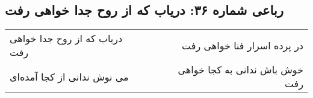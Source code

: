\begin{center}
\section*{رباعی شماره ۳۶: دریاب که از روح جدا خواهی رفت}
\label{sec:sh036}
\begin{longtable}{l p{0.5cm} r}
دریاب که از روح جدا خواهی رفت
&&
در پرده اسرار فنا خواهی رفت
\\
می نوش ندانی از کجا آمده‌ای
&&
خوش باش ندانی به کجا خواهی رفت
\\
\end{longtable}
\end{center}
